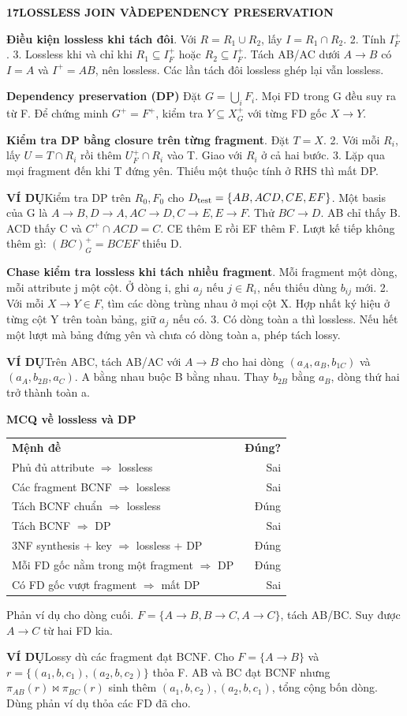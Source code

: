 \documentclass[a4paper]{article}
\newcommand{\bodyfontsize}{5.55}
\newcommand{\bodyleading}{5.2}
\newcommand{\bodylineskiplimit}{-2pt}
\newcommand{\bodystyle}{%
  \fontsize{\bodyfontsize}{\bodyleading}\selectfont\setlength{\lineskiplimit}{\bodylineskiplimit}\RaggedRight
  \setlength{\abovedisplayskip}{.5pt}\setlength{\belowdisplayskip}{.5pt}%
  \setlength{\abovedisplayshortskip}{.3pt}\setlength{\belowdisplayshortskip}{.3pt}}
\newcommand{\topic}[2]{\par\addvspace{.45pt}\nointerlineskip%
  \begingroup\setlength{\fboxsep}{0.35pt}%
  \noindent\colorbox{structure}{\parbox{\dimexpr\linewidth-2\fboxsep\relax}{%
    \color{white}\fontsize{6.45}{6.8}\selectfont\bfseries #1\enspace #2}}%
  \endgroup\par\nobreak\vspace{.55pt}\nointerlineskip\nobreak}
\newenvironment{topicblock}
  {\par\bodystyle}
  {\par}
\newcommand{\key}[1]{\par\textcolor{structure}{\textbf{#1}}\enspace}
\newcommand{\note}[4]{\par\nointerlineskip\vspace{.25pt}\begingroup\setlength{\fboxsep}{0.1pt}%
  \noindent\colorbox{#1}{\parbox{\dimexpr\linewidth-2\fboxsep\relax}{%
    \RaggedRight\textcolor{#2}{\textbf{#3}}\enspace #4}}%
  \endgroup\par\nointerlineskip\vspace{.25pt}}
\newcommand{\ex}[1]{\note{examplebg}{example}{VÍ DỤ}{#1}}
\newlength{\sheetwidth}
\newenvironment{sheetcolumns}[1]
  {\noindent\begin{minipage}[t]{#1\sheetwidth}\vspace{0pt}\bodystyle\ignorespaces}
  {\end{minipage}\par}
\begin{document}
\begin{sheetcolumns}{.272}
\begin{topicblock}
\topic{17}{LOSSLESS JOIN VÀ\newline DEPENDENCY PRESERVATION}
\key{Điều kiện lossless khi tách đôi}
1. Với $R=R_1\cup R_2$, lấy $I=R_1\cap R_2$. 2. Tính $I_F^+$.
3. Lossless khi và chỉ khi $R_1\subseteq I_F^+$ hoặc $R_2\subseteq I_F^+$. Tách AB/AC dưới $A\to B$ có $I=A$ và $I^+=AB$, nên lossless. Các lần tách đôi lossless ghép lại vẫn lossless.
\key{Dependency preservation (DP)}
Đặt $G=\bigcup_i F_i$. Mọi FD trong G đều suy ra từ F. Để chứng minh $G^+=F^+$, kiểm tra $Y\subseteq X_G^+$ với từng FD gốc $X\to Y$.
\key{Kiểm tra DP bằng closure trên từng fragment}
1. Đặt $T=X$. 2. Với mỗi $R_i$, lấy $U=T\cap R_i$ rồi thêm $U_F^+\cap R_i$ vào T. Giao với $R_i$ ở cả hai bước.
3. Lặp qua mọi fragment đến khi T đứng yên. Thiếu một thuộc tính ở RHS thì mất DP.
\ex{Kiểm tra DP trên $R_0,F_0$ cho $D_{\rm test}=\{AB,ACD,CE,EF\}$. Một basis của G là $A\to B,D\to A,AC\to D,C\to E,E\to F$.
Thử $BC\to D$. AB chỉ thấy B. ACD thấy C và $C^+\cap ACD=C$. CE thêm E rồi EF thêm F. Lượt kế tiếp không thêm gì: $(BC)^+_G=BCEF$ thiếu D.}
\key{Chase kiểm tra lossless khi tách nhiều fragment}
1. Mỗi fragment một dòng, mỗi attribute j một cột. Ở dòng i, ghi $a_j$ nếu $j\in R_i$, nếu thiếu dùng $b_{ij}$ mới.
2. Với mỗi $X\to Y\in F$, tìm các dòng trùng nhau ở mọi cột X. Hợp nhất ký hiệu ở từng cột Y trên toàn bảng, giữ $a_j$ nếu có.
3. Có dòng toàn a thì lossless. Nếu hết một lượt mà bảng đứng yên và chưa có dòng toàn a, phép tách lossy.
\ex{Trên ABC, tách AB/AC với $A\to B$ cho hai dòng $(a_A,a_B,b_{1C})$ và $(a_A,b_{2B},a_C)$. A bằng nhau buộc B bằng nhau. Thay $b_{2B}$ bằng $a_B$, dòng thứ hai trở thành toàn a.}
\key{MCQ về lossless và DP}
\par\begin{tabular}{@{}lr@{}}
\textbf{Mệnh đề} & \textbf{Đúng?}\\
Phủ đủ attribute $\Rightarrow$ lossless & Sai\\
Các fragment BCNF $\Rightarrow$ lossless & Sai\\
Tách BCNF chuẩn $\Rightarrow$ lossless & Đúng\\
Tách BCNF $\Rightarrow$ DP & Sai\\
3NF synthesis + key $\Rightarrow$ lossless + DP & Đúng\\
Mỗi FD gốc nằm trong một fragment $\Rightarrow$ DP & Đúng\\
Có FD gốc vượt fragment $\Rightarrow$ mất DP & Sai
\end{tabular}\par
Phản ví dụ cho dòng cuối. $F=\{A\to B,B\to C,A\to C\}$, tách AB/BC. Suy được $A\to C$ từ hai FD kia.
\ex{Lossy dù các fragment đạt BCNF. Cho $F=\{A\to B\}$ và $r=\{(a_1,b,c_1),(a_2,b,c_2)\}$ thỏa F. AB và BC đạt BCNF nhưng $\pi_{AB}(r)\bowtie\pi_{BC}(r)$ sinh thêm $(a_1,b,c_2),(a_2,b,c_1)$, tổng cộng bốn dòng. Dùng phản ví dụ thỏa các FD đã cho.}
\end{topicblock}


\end{sheetcolumns}
\end{document}
